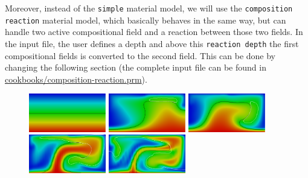 \documentclass{article}
\begin{document}



Moreover, instead of the \texttt{simple} material model, we will use the \texttt{composition reaction} material model, which basically behaves in the same way, but can handle two active compositional field and a reaction between those two fields. In the input file, the user defines a depth and above this \texttt{reaction depth} the first compositional fields is converted to the second field. This can be done by changing the following section (the complete input file can be found in \url{cookbooks/composition-reaction.prm}).



\begin{figure}
  \centering
  \includegraphics[width=0.3\textwidth]{cookbooks/composition-reaction/doc/0.png}
  \hfill
  \includegraphics[width=0.3\textwidth]{cookbooks/composition-reaction/doc/2.png}
  \hfill
  \includegraphics[width=0.3\textwidth]{cookbooks/composition-reaction/doc/4.png}
  \\[6pt]
  \includegraphics[width=0.3\textwidth]{cookbooks/composition-reaction/doc/8.png}
  \hfill
  \includegraphics[width=0.3\textwidth]{cookbooks/composition-reaction/doc/12.png}

\end{figure}
\end{document}
